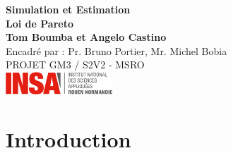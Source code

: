 \documentclass{article}
\begin{document}


\begin{titlepage}
	\centering
	\vfill
	{
		\bfseries\Large
		Simulation et Estimation \\
		Loi de Pareto \\
	}    
	\vskip1cm
	{	
		\bfseries\large
		Tom Boumba et Angelo Castino \\
	}
	\vskip2cm
		Encadré par : Pr. Bruno Portier, Mr. Michel Bobia \\
		PROJET GM3 / S2V2 - MSRO\\
	\vfill
	\includegraphics[width=4cm]{logo_insa}
	\vfill
	\vfill
\end{titlepage}


\pagebreak

\tableofcontents

\pagebreak

\section{Introduction}
\end{document}
